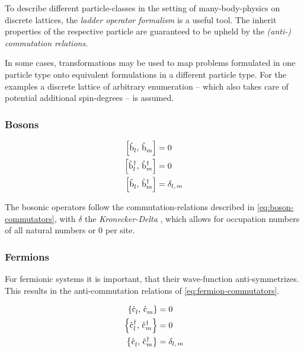 To describe different particle-classes in the setting of many-body-physics on discrete lattices, the \emph{ladder operator formalism} is a useful tool. 
The inherit properties of the respective particle are guaranteed to be upheld by the \emph{(anti-) commutation relations}.

In some cases, transformations may be used to map problems formulated in one particle type onto equivalent formulations in a different particle type.
For the examples a discrete lattice of arbitrary enumeration -- which also takes care of potential additional spin-degrees -- is assumed.

\subsubsection*{Bosons}

\begin{equation}
    \label{eq:boson-commutators}
    \begin{split}
        \left[\hat{\text{b}}^{ }_{l},\,\hat{\text{b}}^{ }_{m}\right] &= 0\\
        \left[\hat{\text{b}}^{\dagger }_{l},\,\hat{\text{b}}^{\dagger }_{m}\right] &= 0\\
        \left[\hat{\text{b}}^{ }_{l},\,\hat{\text{b}}^{\dagger }_{m}\right] &= \delta_{l,\,m}\\
    \end{split}
\end{equation}

The bosonic operators follow the commutation-relations described in \autoref{eq:boson-commutators}, with $\delta$ the \emph{Kronecker-Delta} \cite{schwablBookII}, which allows for occupation numbers of all natural numbers or $0$ per site.

\subsubsection*{Fermions}

For fermionic systems it is important, that their wave-function anti-symmetrizes. This results in the anti-commutation relations of  \autoref{eq:fermion-commutators}.

\begin{equation}
    \label{eq:fermion-commutators}
    \begin{split}
        \left\{\hat{\text{c}}^{ }_{l},\,\hat{\text{c}}^{ }_{m}\right\} &= 0\\
        \left\{\hat{\text{c}}^{\dagger }_{l},\,\hat{\text{c}}^{\dagger }_{m}\right\} &= 0\\
        \left\{\hat{\text{c}}^{ }_{l},\,\hat{\text{c}}^{\dagger }_{m}\right\} &= \delta_{l,\,m}\\
    \end{split}
\end{equation}

